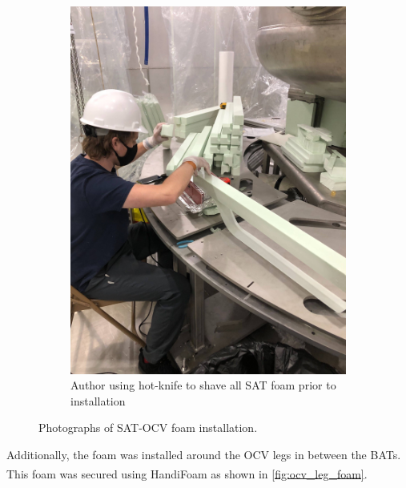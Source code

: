 \begin{figure}[]
\begin{subfigure}{.5\textwidth}
  \includegraphics[width=\linewidth]{Figures/Construction/foam_shaving.jpg}
  \caption{Author using hot-knife to shave all SAT foam prior to installation}
  \label{fig:sat_foam_shaving}
  \end{subfigure}
\caption{Photographs of SAT-OCV foam installation.}
\label{fig:SAT_foam_installation}
\end{figure}

\par
Additionally, the foam was installed around the OCV legs in between the BATs.
This foam was secured using HandiFoam\textsuperscript{\textregistered} as shown in \autoref{fig:ocv_leg_foam}.

